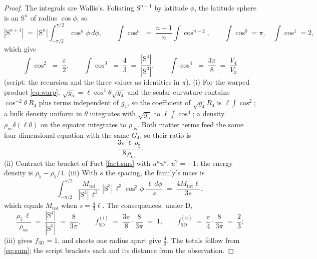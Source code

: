\documentclass[11pt]{article}
\theoremstyle{definition}
\newcommand{\Sph}{\mathrm{S}}
\begin{document}
\begin{proof}
The integrals are Wallis's. Foliating $\Sph^{n+1}$ by latitude $\phi$, the latitude sphere is an $\Sph^{n}$ of radius $\cos\phi$, so
\[
|\Sph^{n+1}| \;=\; |\Sph^{n}|\int_{-\pi/2}^{\pi/2}\cos^{n}\phi\,d\phi, \qquad \int\cos^{n} \;=\; \frac{n-1}{n}\int\cos^{n-2}, \qquad \int\cos^{0} = \pi, \quad \int\cos^{1} = 2,
\]
which give
\[
\int\cos^{2} \;=\; \frac{\pi}{2}, \qquad \int\cos^{3} \;=\; \frac{4}{3} \;=\; \frac{|\Sph^{4}|}{|\Sph^{3}|}, \qquad \int\cos^{4} \;=\; \frac{3\pi}{8} \;=\; \frac{V_{4}}{V_{3}}
\]
(script: the recursion and the three values as identities in $\pi$). (i) For the warped product \eqref{eq:warp}, $\sqrt{g_{5}} = \ell\cos^{4}\theta\sqrt{g_{4}}$ and the scalar curvature contains $\cos^{-2}\theta\,R_{4}$ plus terms independent of $g_{4}$, so the coefficient of $\sqrt{g_{4}}R_{4}$ is $\ell\int\cos^{2}$; a bulk density uniform in $\theta$ integrates with $\sqrt{g_{5}}$ to $\ell\int\cos^{4}$; a density $\rho_{\mathrm{us}}\delta(\ell\theta)$ on the equator integrates to $\rho_{\mathrm{us}}$. Both matter terms feed the same four-dimensional equation with the same $G_{4}$, so their ratio is
\[
\frac{3\pi\,\ell\,\rho_{5}}{8\,\rho_{\mathrm{us}}}.
\]
(ii) Contract the bracket of Fact \ref{fact:sms} with $u^{\mu}u^{\nu}$, $u^{2} = -1$: the energy density is $\rho_{5} - \rho_{5}/4$. (iii) With $s$ the spacing, the family's mass is
\[
\int_{-\pi/2}^{\pi/2}\frac{M_{\mathrm{tot}}}{|\Sph^{3}|\,\ell^{3}}\;|\Sph^{3}|\,\ell^{3}\cos^{3}\phi\;\frac{\ell\,d\phi}{s}
\;=\; \frac{4M_{\mathrm{tot}}\ell}{3s},
\]
which equals $M_{\mathrm{tot}}$ when $s = \tfrac{4}{3}\ell$. The consequences: under D,
\[
\frac{\rho_{5}\,\ell}{\rho_{\mathrm{us}}} \;=\; \frac{|\Sph^{4}|}{|\Sph^{5}|} \;=\; \frac{8}{3\pi}, \qquad
f_{5\mathrm{D}}^{\mathrm{(i)}} \;=\; \frac{3\pi}{8}\cdot\frac{8}{3\pi} \;=\; 1, \qquad
f_{5\mathrm{D}}^{\mathrm{(ii)}} \;=\; \frac{\pi}{4}\cdot\frac{8}{3\pi} \;=\; \frac{2}{3};
\]
(iii) gives $f_{3\mathrm{D}} = 1$, and sheets one radius apart give $\tfrac{4}{3}$. The totals follow from \eqref{eq:sum}; the script brackets each and its distance from the observation.
\end{proof}
\end{document}
